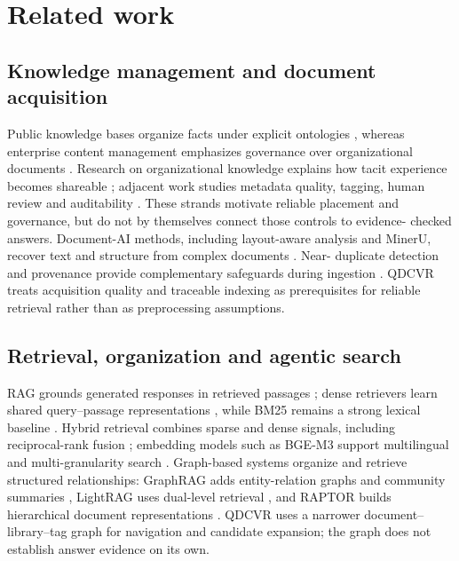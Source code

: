 \section{Related work}
\label{sec:related}

\subsection{Knowledge management and document acquisition}
Public knowledge bases organize facts under explicit ontologies
\citep{auer-dbpedia-kb-2007,hoffart-yago2-kb-2013}, whereas enterprise content
management emphasizes governance over organizational documents
\citep{paivarinta-ecm-2005,tyrvaainen-ecm-2006}. Research on organizational
knowledge explains how tacit experience becomes shareable
\citep{nonaka-seci-1994,nonaka-seci-ba-2000}; adjacent work studies metadata
quality, tagging, human review and auditability
\citep{park-metadata-quality-2009,golder-tagging-2006,mosqueira-rey-hitl-2022,barredo-arrieta-xai-2020}. These strands motivate reliable placement
and governance, but do not by themselves connect those controls to evidence-
checked answers. Document-AI methods, including layout-aware analysis and
MinerU, recover text and structure from complex documents
\citep{zhong-publaynet-layout-2019,huang-layoutlmv3-docai-2022,mineru}. Near-
duplicate detection and provenance provide complementary safeguards during
ingestion \citep{manku-near-dup-2007,missier-prov-2013,cheney-provenance-2009}.
QDCVR treats acquisition quality and traceable indexing as prerequisites for
reliable retrieval rather than as preprocessing assumptions.

\subsection{Retrieval, organization and agentic search}
RAG grounds generated responses in retrieved passages \citep{rag-lewis}; dense
retrievers learn shared query--passage representations \citep{dpr}, while BM25
remains a strong lexical baseline \citep{bm25}. Hybrid retrieval combines
sparse and dense signals, including reciprocal-rank fusion
\citep{rrf-cormack}; embedding models such as BGE-M3 support multilingual and
multi-granularity search \citep{bge-m3}. Graph-based systems organize and
retrieve structured relationships: GraphRAG adds entity-relation graphs and
community summaries \citep{graphrag}, LightRAG uses dual-level retrieval
\citep{lightrag}, and RAPTOR builds hierarchical document representations
\citep{raptor}. QDCVR uses a narrower document--library--tag graph for
navigation and candidate expansion; the graph does not establish answer
evidence on its own.

